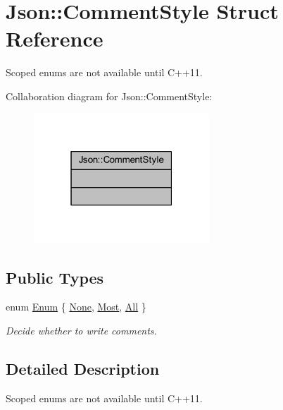 \hypertarget{struct_json_1_1_comment_style}{}\section{Json\+:\+:Comment\+Style Struct Reference}
\label{struct_json_1_1_comment_style}


Scoped enums are not available until C++11.  




Collaboration diagram for Json\+:\+:Comment\+Style\+:\nopagebreak
\begin{figure}[H]
\begin{center}
\leavevmode
\includegraphics[width=187pt]{struct_json_1_1_comment_style__coll__graph}
\end{center}
\end{figure}
\subsection*{Public Types}
\begin{DoxyCompactItemize}
\item 
enum \hyperlink{struct_json_1_1_comment_style_a51fc08f3518fd81eba12f340d19a3d0c}{Enum} \{ \hyperlink{struct_json_1_1_comment_style_a51fc08f3518fd81eba12f340d19a3d0cac8b32a8bae63414c8647d4919da8d437}{None}, 
\hyperlink{struct_json_1_1_comment_style_a51fc08f3518fd81eba12f340d19a3d0cac65238f050773c107690a456e9c05c98}{Most}, 
\hyperlink{struct_json_1_1_comment_style_a51fc08f3518fd81eba12f340d19a3d0ca32302c0b97190c1808b3e38f367fef01}{All}
 \}\begin{DoxyCompactList}\small\item\em Decide whether to write comments. \end{DoxyCompactList}
\end{DoxyCompactItemize}


\subsection{Detailed Description}
Scoped enums are not available until C++11. 

